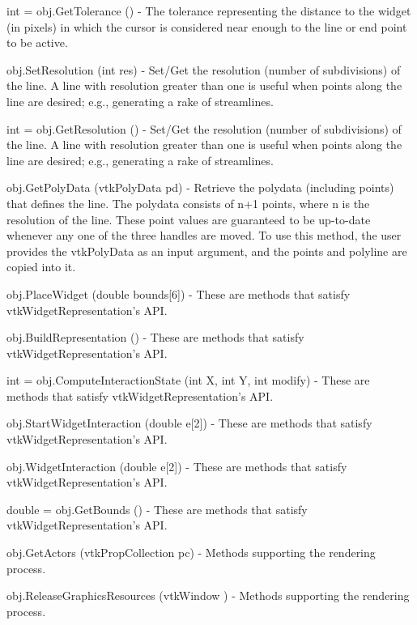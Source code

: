 \begin{DoxyItemize}
\item {\ttfamily int = obj.\-Get\-Tolerance ()} -\/ The tolerance representing the distance to the widget (in pixels) in which the cursor is considered near enough to the line or end point to be active.  
\item {\ttfamily obj.\-Set\-Resolution (int res)} -\/ Set/\-Get the resolution (number of subdivisions) of the line. A line with resolution greater than one is useful when points along the line are desired; e.\-g., generating a rake of streamlines.  
\item {\ttfamily int = obj.\-Get\-Resolution ()} -\/ Set/\-Get the resolution (number of subdivisions) of the line. A line with resolution greater than one is useful when points along the line are desired; e.\-g., generating a rake of streamlines.  
\item {\ttfamily obj.\-Get\-Poly\-Data (vtk\-Poly\-Data pd)} -\/ Retrieve the polydata (including points) that defines the line. The polydata consists of n+1 points, where n is the resolution of the line. These point values are guaranteed to be up-\/to-\/date whenever any one of the three handles are moved. To use this method, the user provides the vtk\-Poly\-Data as an input argument, and the points and polyline are copied into it.  
\item {\ttfamily obj.\-Place\-Widget (double bounds\mbox{[}6\mbox{]})} -\/ These are methods that satisfy vtk\-Widget\-Representation's A\-P\-I.  
\item {\ttfamily obj.\-Build\-Representation ()} -\/ These are methods that satisfy vtk\-Widget\-Representation's A\-P\-I.  
\item {\ttfamily int = obj.\-Compute\-Interaction\-State (int X, int Y, int modify)} -\/ These are methods that satisfy vtk\-Widget\-Representation's A\-P\-I.  
\item {\ttfamily obj.\-Start\-Widget\-Interaction (double e\mbox{[}2\mbox{]})} -\/ These are methods that satisfy vtk\-Widget\-Representation's A\-P\-I.  
\item {\ttfamily obj.\-Widget\-Interaction (double e\mbox{[}2\mbox{]})} -\/ These are methods that satisfy vtk\-Widget\-Representation's A\-P\-I.  
\item {\ttfamily double = obj.\-Get\-Bounds ()} -\/ These are methods that satisfy vtk\-Widget\-Representation's A\-P\-I.  
\item {\ttfamily obj.\-Get\-Actors (vtk\-Prop\-Collection pc)} -\/ Methods supporting the rendering process.  
\item {\ttfamily obj.\-Release\-Graphics\-Resources (vtk\-Window )} -\/ Methods supporting the rendering process.  

\end{DoxyItemize}
